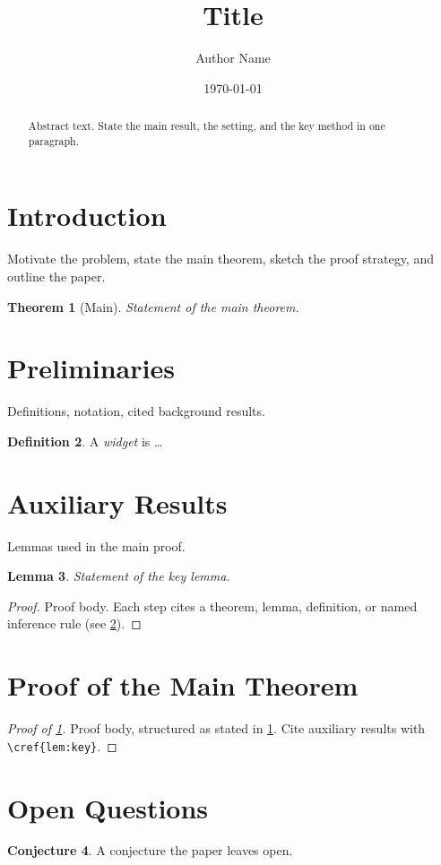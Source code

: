 \documentclass[11pt, reqno]{amsart}
\title{Title}
\author{Author Name}
\date{\today}
\theoremstyle{plain}
\newtheorem{theorem}{Theorem}[section]
\newtheorem{lemma}[theorem]{Lemma}
\theoremstyle{definition}
\newtheorem{definition}[theorem]{Definition}
\newtheorem{conjecture}[theorem]{Conjecture}
\theoremstyle{remark}
\begin{document}
\begin{abstract}
Abstract text. State the main result, the setting, and the key method in one paragraph.
\end{abstract}

\maketitle

\section{Introduction}\label{sec:intro}

Motivate the problem, state the main theorem, sketch the proof strategy, and
outline the paper.

\begin{theorem}[Main]\label{thm:main}
Statement of the main theorem.
\end{theorem}

\section{Preliminaries}\label{sec:prelim}

Definitions, notation, cited background results.

\begin{definition}\label{def:widget}
A \emph{widget} is \ldots
\end{definition}

\section{Auxiliary Results}\label{sec:aux}

Lemmas used in the main proof.

\begin{lemma}\label{lem:key}
Statement of the key lemma.
\end{lemma}
\begin{proof}
Proof body. Each step cites a theorem, lemma, definition, or named inference
rule (see \cref{def:widget}).
\end{proof}

\section{Proof of the Main Theorem}\label{sec:proof}

\begin{proof}[Proof of \cref{thm:main}]
Proof body, structured as stated in \cref{sec:intro}. Cite auxiliary results
with \verb|\cref{lem:key}|.
\end{proof}

\section{Open Questions}\label{sec:open}

\begin{conjecture}\label{conj:one}
A conjecture the paper leaves open.
\end{conjecture}



\end{document}
